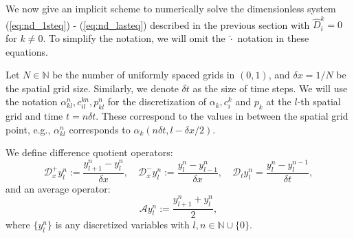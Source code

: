 \documentclass{article}
\begin{document}
We now give an implicit scheme to numerically solve the dimensionless system (\ref{eq:nd_1steq}) - (\ref{eq:nd_lasteq}) described in the previous section with $\hat{D}_i^k=0$ for $k\neq 0$.
To simplify the notation, we will omit the $\hat{\cdot}$ notation in these equations.

Let $N\in \mathbb{N}$ be the number of uniformly spaced grids in $(0,1)$, and $\delta x = 1/N$ be the spatial grid size.
Similarly, we denote $\delta t$ as the size of time steps.
We will use the notation $\alpha^{n}_{kl},c_{il}^{kn}, p_{kl}^{n}$ for the discretization of $\alpha_k,c_i^k$ and $p_k$ at the $l$-th spatial grid and time $t = n\delta t$.
These correspond to the values in between the spatial grid point, e.g., $\alpha_{kl}^n$ corresponds to $\alpha_k(n\delta t,l-\delta x/2)$.

We define difference quotient operators:
\begin{equation}
    \mathcal{D}_x^+y^n_l:= \frac{y^n_{l+1}-y^n_{l}}{\delta x},\quad \mathcal{D}_x^- y^n_l :=\frac{y^n_l-y^n_{l-1}}{\delta x},\quad \mathcal{D}_t y^n_l = \frac{y^n_l - y^{n-1}_l}{\delta t},
\end{equation}
and an average operator:
\begin{equation}
    \mathcal{A} y_l^n := \frac{y^n_{l+1}+y^n_l}{2},
\end{equation}
    where $\{y_l^n\}$ is any discretized variables with $l,n\in \mathbb{N}\cup\{0\}$.
\end{document}
